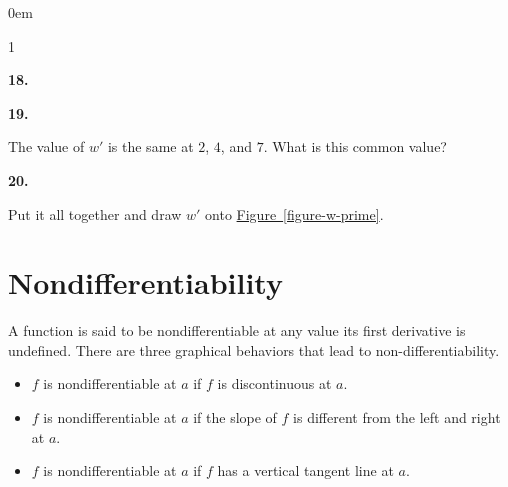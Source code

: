 \documentclass[12pt,]{book}
\theoremstyle{plain}
\theoremstyle{definition}
\numberwithin{equation}{section}
\newcounter{figstack}
\newcounter{figindex}
\newlength\fight
\newcommand\pushValignCaptionBottom[5][b]{%
\stepcounter{figstack}%
\expandafter\def\csname %
figalign\romannumeral\value{figstack}\endcsname{#1}%
\expandafter\def\csname %
figtype\romannumeral\value{figstack}\endcsname{#2}%
\expandafter\def\csname %
figwd\romannumeral\value{figstack}\endcsname{#3}%
\expandafter\def\csname %
figcontent\romannumeral\value{figstack}\endcsname{#4}%
\expandafter\def\csname %
figcap\romannumeral\value{figstack}\endcsname{#5}%
\setbox0=\hbox{%
\begin{#2}{#3}#4\end{#2}}%
\ifdim\dimexpr\ht0+\dp0\relax>\fight\global\setlength{\fight}{%
\dimexpr\ht0+\dp0\relax}\fi%
}
\newcommand\popValignCaptionBottom{%
\setcounter{figindex}{0}%
\hfill%
\whiledo{\value{figindex}<\value{figstack}}{%
\stepcounter{figindex}%
\def\tmp{\csname figwd\romannumeral\value{figindex}\endcsname}%
\begin{\csname figtype\romannumeral\value{figindex}\endcsname}[t]{\tmp}%
\centering%
\stackinset{c}{}%
{\csname figalign\romannumeral\value{figindex}\endcsname}{}%
{\csname figcontent\romannumeral\value{figindex}\endcsname}%
{\rule{0pt}{\fight}}\par%
\csname figcap\romannumeral\value{figindex}\endcsname%
\end{\csname figtype\romannumeral\value{figindex}\endcsname}%
\hfill%
}%
\setcounter{figstack}{0}%
\setlength{\fight}{0pt}%
\hfill%
}
\newenvironment{exercisegroup}%
{\medskip\noindent}%
{\par\bigskip}%
\newlength{\exercisegroupindent}%
\newlength{\exercisegroupitemwidth}%
\newenvironment{exercisegrouplist}%
{\vspace{-\partopsep}%
\begin{adjustwidth}{\exercisegroupindent}{0em}}%
{\end{adjustwidth}%
\vspace{-\partopsep}%
\vspace{\baselineskip}}%
\newenvironment{exercisegroupbycol}[1]%
{\begin{exercisegrouplist}%
\vspace{-\multicolsep}%
\begin{multicols}{#1}%
\setlength{\parindent}{0em}%
\setlength{\exercisegroupitemwidth}{\linewidth}}%
{\end{multicols}%
\vspace{-\multicolsep}%
\end{exercisegrouplist}}%
\newenvironment{exercisegroupitem}[1]%
{\begin{minipage}[t]{\exercisegroupitemwidth}
\vspace{0pt}%
{\bfseries#1}%
\rule{0pt}{\baselineskip}}{\strut%
\end{minipage}%
\hspace{\columnsep}}%
\providecommand\phantomsection{}
\newcommand{\fe}[2]{\mathop{{#1}{\left(#2\right)}}}
\newcommand{\fd}[1]{#1'}
\begin{document}
\begin{exercisegroup}
\begin{exercisegroupbycol}{1}
\begin{exercisegroupitem}{18. }
\end{exercisegroupitem}%
\par%
\begin{exercisegroupitem}{19. }\phantomsection\hypertarget{exercise-228}{\null}
The value of \(\fd{w}\) is the same at \(2\), \(4\), and \(7\). What is this common value?%
\end{exercisegroupitem}%
\par%
\begin{exercisegroupitem}{20. }\phantomsection\hypertarget{exercise-229}{\null}
Put it all together and draw \(\fd{w}\) onto \hyperref[figure-w-prime]{Figure~\ref*{figure-w-prime}}.%
\end{exercisegroupitem}%
\par%
\end{exercisegroupbycol}%
\end{exercisegroup}%
\typeout{************************************************}
\typeout{************************************************}
\section[Nondifferentiability]{Nondifferentiability}\label{section-nondifferentiability}
A function is said to be nondifferentiable at any value its first derivative is undefined.  There are three graphical behaviors that lead to non-differentiability.%
\begin{itemize}[label=\textbullet]
\item{}\(f\) is nondifferentiable at \(a\) if \(f\) is discontinuous at \(a\).\item{}\(f\) is nondifferentiable at \(a\) if the slope of \(f\) is different from the left and right at \(a\).\item{}\(f\) is nondifferentiable at \(a\) if \(f\) has a vertical tangent line at \(a\).\end{itemize}
\typeout{************************************************}
\typeout{************************************************}
\end{document}
